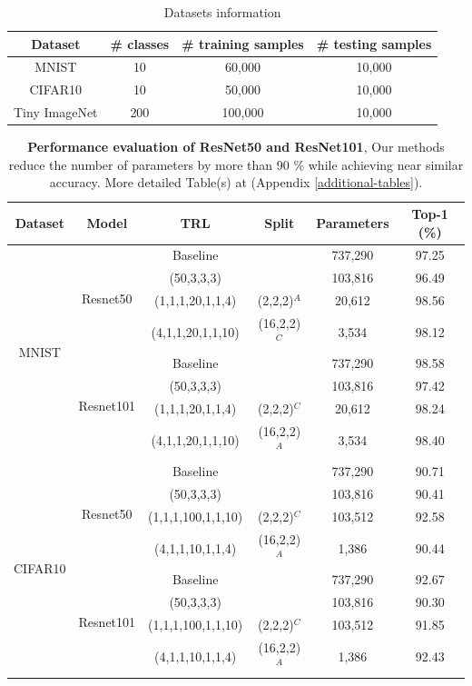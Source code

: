\documentclass{article}
\begin{document}
		\begin{table}
		\centering
		\caption{
			Datasets information
		}
		\label{table:datasets}
		\begin{tabular}{c c c c}
			\toprule
			\textbf{Dataset} & \textbf{\# classes} & \textbf{\# training samples} & \textbf{\# testing samples} 
			\\
			\midrule
			 MNIST	& 10    &  60,000   &  10,000  \\
			\midrule
			CIFAR10	& 10  & 50,000   & 10,000   \\
			\midrule
			Tiny ImageNet	& 200  & 100,000  &  10,000 \\
			\bottomrule
		\end{tabular}
	\end{table}
	\begin{table}
		\centering
		\caption{
		\textbf{Performance evaluation of ResNet50 and ResNet101}, Our methods reduce the number of parameters by more than 90 \% while achieving near similar accuracy. More detailed Table(s) at (Appendix \ref{additional-tables}).
			}
		\label{table:resnet_mnist_cifar10}
		\begin{tabular}{c c c c c c}
			\toprule
			\textbf{Dataset} & \textbf{Model} & \textbf{TRL} & \textbf{Split} & \textbf{Parameters} & \textbf{Top-1 (\%)} \\
			\midrule
			\multirow{8}{*}{MNIST} & \multirow{4}{*}{Resnet50} &  Baseline &   & 737,290 & 97.25 \\ 
			& & (50,3,3,3) &   & 103,816 & 96.49 \\ 
			& & (1,1,1,20,1,1,4) & (2,2,2)\(^A\) & 20,612 & 98.56 \\ 
			& & (4,1,1,20,1,1,10) & (16,2,2)\(^C\) & 3,534 & 98.12 \\ 
			\cmidrule(lr){2-6}
			& \multirow{4}{*}{Resnet101} &  Baseline &   & 737,290 & 98.58 \\ 
			& & (50,3,3,3) &   & 103,816 & 97.42 \\ 
			& & (1,1,1,20,1,1,4) & (2,2,2)\(^C\) & 20,612 & 98.24 \\ 
			& & (4,1,1,20,1,1,10) & (16,2,2)\(^A\) & 3,534 & 98.40 \\ 
			\midrule
			\multirow{8}{*}{CIFAR10} & \multirow{4}{*}{Resnet50} &  Baseline &   & 737,290 & 90.71 \\ 
			& & (50,3,3,3) &   & 103,816 & 90.41 \\ 
			& & (1,1,1,100,1,1,10) & (2,2,2)\(^C\) & 103,512 & 92.58 \\ 
			& & (4,1,1,10,1,1,4) & (16,2,2)\(^A\) & 1,386 & 90.44 \\ 
			\cmidrule(lr){2-6}
			& \multirow{4}{*}{Resnet101} &  Baseline &   & 737,290 & 92.67 \\ 
			& & (50,3,3,3) &   & 103,816 & 90.30 \\ 
			& & (1,1,1,100,1,1,10) & (2,2,2)\(^C\) & 103,512 & 91.85 \\ 
			& & (4,1,1,10,1,1,4) & (16,2,2)\(^A\) & 1,386 & 92.43 \\ 
			\bottomrule
		\end{tabular}
	\end{table}
\end{document}
